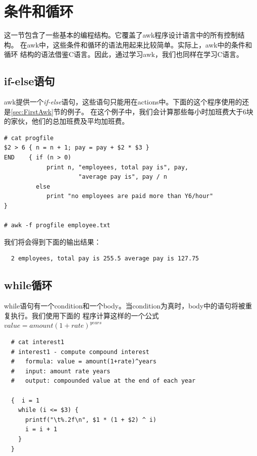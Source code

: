 \section{条件和循环}

这一节包含了一些基本的编程结构。它覆盖了awk程序设计语言中的所有控制结构。
在awk中，这些条件和循环的语法用起来比较简单。实际上，awk中的条件和循环
结构的语法借鉴C语言。因此，通过学习awk，我们也同样在学习C语言。

\subsection{if-else语句}

awk提供一个\textit{if-else}语句，这些语句只能用在actions中。下面的这个程序使用的还是\ref{sec:FirstAwk}节的例子。
在这个例子中，我们会计算那些每小时加班费大于6块的家伙，他们的总加班费及平均加班费。

\small{
\begin{verbatim}
# cat progfile
$2 > 6 { n = n + 1; pay = pay + $2 * $3 }
END    { if (n > 0)
            print n, "employees, total pay is", pay,
                     "average pay is", pay / n
         else
            print "no employees are paid more than Y6/hour"
}

# awk -f progfile employee.txt

\end{verbatim}
}
\normalsize

我们将会得到下面的输出结果：

\small{
\begin{verbatim}
  2 employees, total pay is 255.5 average pay is 127.75
\end{verbatim}
}
\normalsize

\subsection{while循环}
\label{subsec:WhileLoop}

while语句有一个condition和一个body。当condition为真时，body中的语句将被重复执行。我们使用下面的
程序计算这样的一个公式$ value = amount(1+rate)^{years} $

\small{
\begin{verbatim}
  # cat interest1 
  # interest1 - compute compound interest
  #   formula: value = amount(1+rate)^years
  #   input: amount rate years
  #   output: compounded value at the end of each year
  
  {  i = 1
    while (i <= $3) {
      printf("\t%.2f\n", $1 * (1 + $2) ^ i)
      i = i + 1
    }
  }
\end{verbatim}
}
\normalsize

